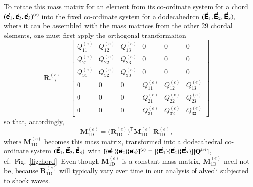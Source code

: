 To rotate this mass matrix for an element from its co-ordinate system for a chord $( \vec{\boldsymbol{\mathsf{e}}}_1 , \vec{\boldsymbol{\mathsf{e}}}_2 , \vec{\boldsymbol{\mathsf{e}}}_3 )^{(e)}$ into the fixed co-ordinate system for a dodecahedron $( \vec{\boldsymbol{\mathsf{E}}}_1 , \vec{\boldsymbol{\mathsf{E}}}_2 , \vec{\boldsymbol{\mathsf{E}}}_3 )$, where it can be assembled with the mass matrices from the other 29 chordal elements, one must first apply the orthogonal transformation
\begin{equation}
    \mathbf{R}^{(e)}_{\mathrm{1D}} = \left[ \begin{array}{ccc|ccc}
    Q^{(e)}_{11} & Q^{(e)}_{12} & Q^{(e)}_{13} & 0 & 0 & 0 \\
    Q^{(e)}_{21} & Q^{(e)}_{22} & Q^{(e)}_{23} & 0 & 0 & 0 \\
    Q^{(e)}_{31} & Q^{(e)}_{32} & Q^{(e)}_{33} & 0 & 0 & 0 \\ \hline
    0 & 0 & 0 & Q^{(e)}_{11} & Q^{(e)}_{12} & Q^{(e)}_{13} \\
    0 & 0 & 0 & Q^{(e)}_{21} & Q^{(e)}_{22} & Q^{(e)}_{23} \\
    0 & 0 & 0 & Q^{(e)}_{31} & Q^{(e)}_{32} & Q^{(e)}_{33} 
    \end{array} \right]
\end{equation}
so that, accordingly,
\begin{equation}
    \mathbf{M}^{(e)}_{\mathrm{1D}} = \bigl( \mathbf{R}^{(e)}_{\mathrm{1D}} \bigr)^{\!\mathsf{T}} \!
    \boldsymbol{M}^{(e)}_{\mathrm{1D}} \, \mathbf{R}^{(e)}_{\mathrm{1D}} ,
\end{equation}
where $\mathbf{M}^{(e)}_{\mathrm{1D}}$ becomes this mass matrix, transformed into a dodecahedral co-ordinate system $( \vec{\boldsymbol{\mathsf{E}}}_1 , \vec{\boldsymbol{\mathsf{E}}}_2 , \vec{\boldsymbol{\mathsf{E}}}_3 )$ with $[ \{ \vec{\boldsymbol{\mathsf{e}}}_1 \} \{ \vec{\boldsymbol{\mathsf{e}}}_2 \} \{ \vec{\boldsymbol{\mathsf{e}}}_3 \} ]^{(e)} = \bigl[ \{ \vec{\boldsymbol{\mathsf{E}}}_1 \} \{ \vec{\boldsymbol{\mathsf{E}}}_2 \} \{ \vec{\boldsymbol{\mathsf{E}}}_3 \} \bigr] \bigl[ \mathbf{Q}^{(e)} ]$, cf.\ Fig.~\ref{figchord}.  Even though $\boldsymbol{M}^{(e)}_{\mathrm{1D}}$ is a constant mass matrix, $\mathbf{M}^{(e)}_{\mathrm{1D}}$ need not be, because $\mathbf{R}^{(e)}_{\mathrm{1D}}$ will typically vary over time in our analysis of alveoli subjected to shock waves.

